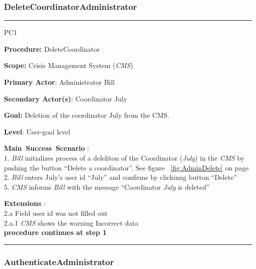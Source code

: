 \subsubsection{DeleteCoordinatorAdministrator}

\vspace{0.5cm}
\hrule
\begin{lyxlist}{PC1}
\small{
\item [\textbf{Procedure:}] DeleteCoordinator
\item [\textbf{Scope:}] Crisis Management System (\emph{CMS})
\item [\textbf{Primary Actor}:] Administrator Bill
\item [\textbf{Secondary Actor(s)}:] Coordinator July
\item [\textbf{Goal:}] Deletion of the coordinator July from the CMS.
\item [\textbf{Level}:] User-goal level
\item [\textbf{Main~Success~Scenario}]:\\
1. \emph{Bill} initializes process of a deleliton of the Coordinator
(\emph{July}) in the \emph{CMS} by pushing the button ``Delete a coordinator''.
See figure ~\ref{fig:AdminDelete} on page~\pageref{fig:AdminDelete}\\
2. \emph{Bill} enters July's user id ``July'' and confirms by clickinng button
``Delete''\\
5. \emph{CMS} informs \emph{Bill} with the message ``Coordinator \emph{July}
is deleted''

\item [\textbf{Extensions}]:\\
2.a Field user id was not filled out\\
\hspace*{0.5cm} 2.a.1 \emph{CMS} shows the warning Incorrect data\\
\hspace*{0.5cm} \textbf{procedure continues at step 1}

}
\end{lyxlist}
\hrule
\vspace{0.5cm}


\subsubsection{AuthenticateAdministrator}

